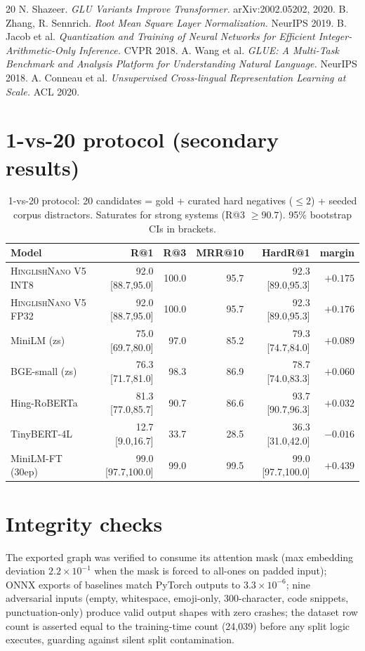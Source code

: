 \documentclass[11pt]{article}
\newcommand{\nano}{\textsc{HinglishNano}}
\begin{document}
\begin{thebibliography}{20}
 N. Shazeer. \emph{GLU Variants Improve Transformer.} arXiv:2002.05202, 2020.
 B. Zhang, R. Sennrich. \emph{Root Mean Square Layer Normalization.} NeurIPS 2019.
 B. Jacob et al. \emph{Quantization and Training of Neural Networks for Efficient Integer-Arithmetic-Only Inference.} CVPR 2018.
 A. Wang et al. \emph{GLUE: A Multi-Task Benchmark and Analysis Platform for Understanding Natural Language.} NeurIPS 2018.
 A. Conneau et al. \emph{Unsupervised Cross-lingual Representation Learning at Scale.} ACL 2020.
\end{thebibliography}

\appendix
\section{1-vs-20 protocol (secondary results)}
\begin{table}[h]
\centering\small
\caption{1-vs-20 protocol: 20 candidates = gold + curated hard negatives ($\le2$) + seeded corpus distractors. Saturates for strong systems (R@3 $\ge 90.7$). 95\% bootstrap CIs in brackets.}
\begin{tabular}{lrrrrr}
\toprule
Model & R@1 & R@3 & MRR@10 & HardR@1 & margin \\
\midrule
\nano{} V5 INT8 & 92.0 {\tiny[88.7,95.0]} & 100.0 & 95.7 & 92.3 {\tiny[89.0,95.3]} & $+0.175$ \\
\nano{} V5 FP32 & 92.0 {\tiny[88.7,95.0]} & 100.0 & 95.7 & 92.3 {\tiny[89.0,95.3]} & $+0.176$ \\
MiniLM (zs) & 75.0 {\tiny[69.7,80.0]} & 97.0 & 85.2 & 79.3 {\tiny[74.7,84.0]} & $+0.089$ \\
BGE-small (zs) & 76.3 {\tiny[71.7,81.0]} & 98.3 & 86.9 & 78.7 {\tiny[74.0,83.3]} & $+0.060$ \\
Hing-RoBERTa & 81.3 {\tiny[77.0,85.7]} & 90.7 & 86.6 & 93.7 {\tiny[90.7,96.3]} & $+0.032$ \\
TinyBERT-4L & 12.7 {\tiny[9.0,16.7]} & 33.7 & 28.5 & 36.3 {\tiny[31.0,42.0]} & $-0.016$ \\
MiniLM-FT (30ep) & 99.0 {\tiny[97.7,100.0]} & 99.0 & 99.5 & 99.0 {\tiny[97.7,100.0]} & $+0.439$ \\
\bottomrule
\end{tabular}
\end{table}

\section{Integrity checks}
The exported graph was verified to consume its attention mask (max embedding deviation $2.2\times10^{-1}$ when the mask is forced to all-ones on padded input); ONNX exports of baselines match PyTorch outputs to $3.3\times10^{-6}$; nine adversarial inputs (empty, whitespace, emoji-only, 300-character, code snippets, punctuation-only) produce valid output shapes with zero crashes; the dataset row count is asserted equal to the training-time count (24{,}039) before any split logic executes, guarding against silent split contamination.
\end{document}
